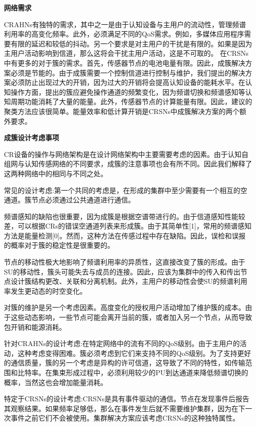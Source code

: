 \documentclass[a4paper,AutoFakeBold,oneside,12pt]{book}
\begin{document}
\begin{center}
\textbf{网络需求}
\end{center}
  CRAHNs有独特的需求，其中之一是由于认知设备与主用户的流动性，管理频谱利用率的高变化频率。此外，必须满足不同的QoS需求。例如，多媒体应用程序需要有限的延迟和较低的抖动。另一个要求是对主用户的干扰是有限的。如果是因为主用户活动影响到信道，那么这将会干扰主用户活动，这是不可取的。
  在CRSNs中有更多的对于簇的需求。首先，传感器节点的电池电量有限。因此，成簇解决方案必须是节能的。由于成簇需要一个控制信道进行控制与维护，我们提出的解决方案必须防止出现过大的开销，因为过大的开销将会提高认知设备的能耗水平。在认知操作方面，提出的簇应避免操作通道的频繁变化，因为频谱切换和频谱感知等认知周期功能消耗了大量的能量。此外，传感器节点的计算能量有限。因此，建议的聚类方法应该很简单。能量效率和低计算开销是CRSNs中成簇解决方案的两个额外要求。

\begin{center}
\textbf{成簇设计考虑事项}
\end{center}

  CR设备的操作与网络架构是在设计网络架构中主要需要考虑的因素。由于认知自组网与认知传感网络的不同要求，成簇的注意事项也会有所不同。因此我们解释了这两种网络中的相同与不同之处。
  
  常见的设计考虑:第一个共同的考虑是，在形成的集群中至少需要有一个相互的空通道。簇节点必须通过公共通道进行通信。

  频谱感知的缺陷也很重要，因为成簇是根据空谱带进行的。由于信道感知性能较差，可以根据CRs的错误空通道列表来形成簇。由于其简单性[1]，常用的频谱感知方法是能量检测[0]。然而，这种方法在传感过程中存在缺陷。因此，误检和误报的概率对于簇的稳定性是很重要的。

  节点的移动性极大地影响了频谱利用率的异质性，这直接改变了簇的形成。由于SU的移动性，簇头可能失去与成员的连接。因此，应该为集群中的传入和传出节点设计簇结构更改、关联和分离机制。此外，主用户的移动性会使SU的频谱利用率发生更动态的时空变化。

  对簇的维护是另一个考虑因素。高度变化的授权用户活动增加了维护簇的成本。由于这些动态影响，一些节点可能会离开当前的簇，或者加入另一个节点，从而导致包开销和能源消耗。

  针对CRAHNs的设计考虑:在特定网络中的流有不同的QoS级别。由于主用户的活动，这种考虑变得困难。簇必须考虑到它们来支持不同的QoS级别。为了支持更好的通信质量，簇的另一个考虑是异构的许可信道，这导致了不同的特性，如传输范围和比特率。在集束形成过程中，必须利用较少的PU到达通道来降低频谱切换的概率，当然这也会增加能量消耗。

  特定于CRSNs的设计考虑:CRSNs是具有事件驱动的通信。节点在发现事件后报告其观察结果。如果频率足够低，那么在事件发生后就不需要维护集群，因为在下一次事件之前它们不会被使用。集群解决方案应该考虑CRSNs的这种独特属性。
\end{document}
